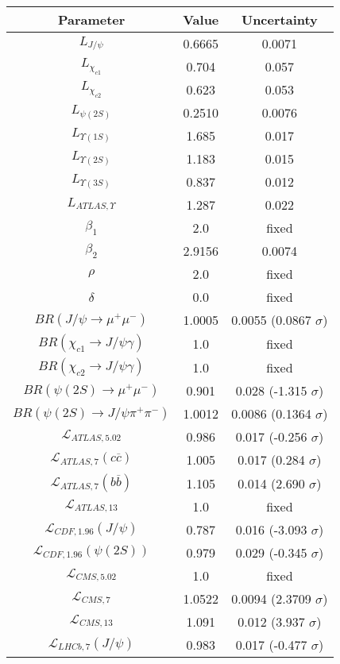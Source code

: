 \begin{table}[h!]
\centering
\begin{tabular}{c|c|c}
Parameter & Value & Uncertainty \\
\hline
$L_{J/\psi}$ & 0.6665 & 0.0071 \\
$L_{\chi_{c1}}$ & 0.704 & 0.057 \\
$L_{\chi_{c2}}$ & 0.623 & 0.053 \\
$L_{\psi(2S)}$ & 0.2510 & 0.0076 \\
$L_{\Upsilon(1S)}$ & 1.685 & 0.017 \\
$L_{\Upsilon(2S)}$ & 1.183 & 0.015 \\
$L_{\Upsilon(3S)}$ & 0.837 & 0.012 \\
$L_{ATLAS,\Upsilon}$ & 1.287 & 0.022 \\
$\beta_1$ & 2.0 & fixed \\
$\beta_2$ & 2.9156 & 0.0074 \\
$\rho$ & 2.0 & fixed \\
$\delta$ & 0.0 & fixed \\
$BR(J/\psi\rightarrow\mu^+\mu^-)$ & 1.0005 & 0.0055 (0.0867 $\sigma$) \\
$BR(\chi_{c1}\rightarrow J/\psi\gamma)$ & 1.0 & fixed \\
$BR(\chi_{c2}\rightarrow J/\psi\gamma)$ & 1.0 & fixed \\
$BR(\psi(2S)\rightarrow\mu^+\mu^-)$ & 0.901 & 0.028 (-1.315 $\sigma$) \\
$BR(\psi(2S)\rightarrow J/\psi\pi^+\pi^-)$ & 1.0012 & 0.0086 (0.1364 $\sigma$) \\
$\mathcal L_{ATLAS,5.02}$ & 0.986 & 0.017 (-0.256 $\sigma$) \\
$\mathcal L_{ATLAS,7}(c\overline c)$ & 1.005 & 0.017 (0.284 $\sigma$) \\
$\mathcal L_{ATLAS,7}(b\overline b)$ & 1.105 & 0.014 (2.690 $\sigma$) \\
$\mathcal L_{ATLAS,13}$ & 1.0 & fixed \\
$\mathcal L_{CDF,1.96}(J/\psi)$ & 0.787 & 0.016 (-3.093 $\sigma$) \\
$\mathcal L_{CDF,1.96}(\psi(2S))$ & 0.979 & 0.029 (-0.345 $\sigma$) \\
$\mathcal L_{CMS,5.02}$ & 1.0 & fixed \\
$\mathcal L_{CMS,7}$ & 1.0522 & 0.0094 (2.3709 $\sigma$) \\
$\mathcal L_{CMS,13}$ & 1.091 & 0.012 (3.937 $\sigma$) \\
$\mathcal L_{LHCb,7}(J/\psi)$ & 0.983 & 0.017 (-0.477 $\sigma$) \\

\end{tabular}
\end{table}
